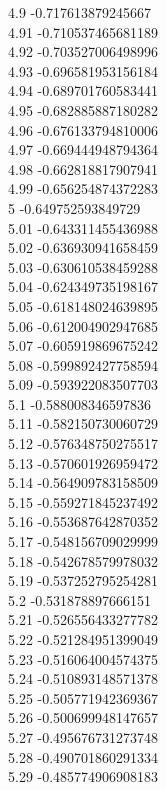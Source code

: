 {4.9	-0.717613879245667\\
4.91	-0.710537465681189\\
4.92	-0.703527006498996\\
4.93	-0.696581953156184\\
4.94	-0.689701760583441\\
4.95	-0.682885887180282\\
4.96	-0.676133794810006\\
4.97	-0.669444948794364\\
4.98	-0.662818817907941\\
4.99	-0.656254874372283\\
5	-0.649752593849729\\
5.01	-0.643311455436988\\
5.02	-0.636930941658459\\
5.03	-0.630610538459288\\
5.04	-0.624349735198167\\
5.05	-0.618148024639895\\
5.06	-0.612004902947685\\
5.07	-0.605919869675242\\
5.08	-0.599892427758594\\
5.09	-0.593922083507703\\
5.1	-0.588008346597836\\
5.11	-0.582150730060729\\
5.12	-0.576348750275517\\
5.13	-0.570601926959472\\
5.14	-0.564909783158509\\
5.15	-0.559271845237492\\
5.16	-0.553687642870352\\
5.17	-0.548156709029999\\
5.18	-0.542678579978032\\
5.19	-0.537252795254281\\
5.2	-0.531878897666151\\
5.21	-0.526556433277782\\
5.22	-0.521284951399049\\
5.23	-0.516064004574375\\
5.24	-0.510893148571378\\
5.25	-0.505771942369367\\
5.26	-0.500699948147657\\
5.27	-0.495676731273748\\
5.28	-0.490701860291334\\
5.29	-0.485774906908183\\
}
